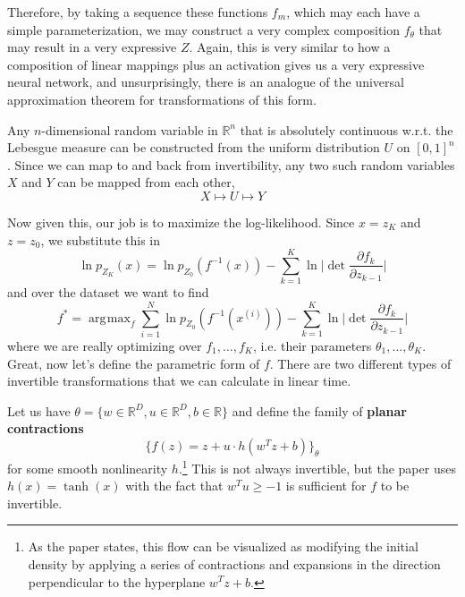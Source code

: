 \documentclass{article}
\DeclareMathOperator*{\argmax}{\arg\!\max}
\begin{document}
  Therefore, by taking a sequence these functions $f_m$, which may each have a simple parameterization, we may construct a very complex composition $f_\theta$ that may result in a very expressive $Z$. Again, this is very similar to how a composition of linear mappings plus an activation gives us a very expressive neural network, and unsurprisingly, there is an analogue of the universal approximation theorem for transformations of this form. 

  \begin{theorem} 
    Any $n$-dimensional random variable in $\mathbb{R}^n$ that is absolutely continuous w.r.t. the Lebesgue measure can be constructed from the uniform distribution $U$ on $[0, 1]^n$. Since we can map to and back from invertibility, any two such random variables $X$ and $Y$ can be mapped from each other, 
    \begin{equation}
      X \mapsto U \mapsto Y 
    \end{equation}
  \end{theorem} 

  Now given this, our job is to maximize the log-likelihood. Since $x = z_K$ and $z = z_0$, we substitute this in 
  \begin{equation}
    \ln p_{Z_K} (x) = \ln p_{Z_0} (f^{-1}(x)) - \sum_{k=1}^K \ln \bigg| \det \frac{\partial f_k}{\partial z_{k-1}} \bigg| 
  \end{equation} 
  and over the dataset we want to find 
  \begin{equation}
    f^\ast = \argmax_{f} \sum_{i=1}^N \ln p_{Z_0} (f^{-1}(x^{(i)})) - \sum_{k=1}^K \ln \bigg| \det \frac{\partial f_k}{\partial z_{k-1}} \bigg| 
  \end{equation}
  where we are really optimizing over $f_1, \ldots, f_K$, i.e. their parameters $\theta_1, \ldots, \theta_K$. Great, now let's define the parametric form of $f$. There are two different types of invertible transformations that we can calculate in linear time. 

  \begin{definition}
    Let us have $\theta = \{w \in \mathbb{R}^D, u \in \mathbb{R}^D, b \in \mathbb{R}\}$ and define the family of \textbf{planar contractions}
    \begin{equation}
      \{f(z) = z + u \cdot h( w^T z + b)\}_\theta
    \end{equation}
    for some smooth nonlinearity $h$.\footnote{As the paper states, this flow can be visualized as modifying the initial density by applying a series of contractions and expansions in the direction perpendicular to the hyperplane $w^T z + b$.} This is not always invertible, but the paper uses $h(x) = \tanh(x)$ with the fact that $w^T u \geq -1$ is sufficient for $f$ to be invertible. 
  \end{definition} 
  
\end{document}
